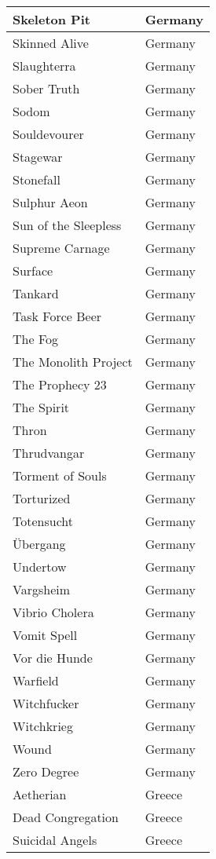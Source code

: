 \documentclass[12pt, a4paper, twoside]{report}
\begin{document}
\begin{center}
\begin{longtable}{|p{5cm}|p{5cm}|}
Skeleton Pit & Germany \\ \hline
Skinned Alive & Germany \\ \hline
Slaughterra & Germany \\ \hline
Sober Truth & Germany \\ \hline
Sodom & Germany \\ \hline
Souldevourer & Germany \\ \hline
Stagewar & Germany \\ \hline
Stonefall & Germany \\ \hline
Sulphur Aeon & Germany \\ \hline
Sun of the Sleepless & Germany \\ \hline
Supreme Carnage & Germany \\ \hline
Surface & Germany \\ \hline
Tankard & Germany \\ \hline
Task Force Beer & Germany \\ \hline
The Fog & Germany \\ \hline
The Monolith Project & Germany \\ \hline
The Prophecy 23 & Germany \\ \hline
The Spirit & Germany \\ \hline
Thron & Germany \\ \hline
Thrudvangar & Germany \\ \hline
Torment of Souls & Germany \\ \hline
Torturized & Germany \\ \hline
Totensucht & Germany \\ \hline
Übergang & Germany \\ \hline
Undertow & Germany \\ \hline
Vargsheim & Germany \\ \hline
Vibrio Cholera & Germany \\ \hline
Vomit Spell & Germany \\ \hline
Vor die Hunde & Germany \\ \hline
Warfield & Germany \\ \hline
Witchfucker & Germany \\ \hline
Witchkrieg & Germany \\ \hline
Wound & Germany \\ \hline
Zero Degree & Germany \\ \hline
Aetherian & Greece \\ \hline
Dead Congregation & Greece \\ \hline
Suicidal Angels & Greece \\ \hline

\end{longtable}
\end{center}
\end{document}

